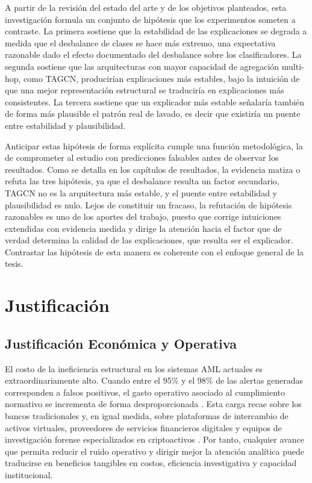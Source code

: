 A partir de la revisión del estado del arte y de los objetivos planteados, esta investigación formula un conjunto de hipótesis que los experimentos someten a contraste. La primera sostiene que la estabilidad de las explicaciones se degrada a medida que el desbalance de clases se hace más extremo, una expectativa razonable dado el efecto documentado del desbalance sobre los clasificadores. La segunda sostiene que las arquitecturas con mayor capacidad de agregación multi-hop, como TAGCN, producirían explicaciones más estables, bajo la intuición de que una mejor representación estructural se traduciría en explicaciones más consistentes. La tercera sostiene que un explicador más estable señalaría también de forma más plausible el patrón real de lavado, es decir que existiría un puente entre estabilidad y plausibilidad.

Anticipar estas hipótesis de forma explícita cumple una función metodológica, la de comprometer al estudio con predicciones falsables antes de observar los resultados. Como se detalla en los capítulos de resultados, la evidencia matiza o refuta las tres hipótesis, ya que el desbalance resulta un factor secundario, TAGCN no es la arquitectura más estable, y el puente entre estabilidad y plausibilidad es nulo. Lejos de constituir un fracaso, la refutación de hipótesis razonables es uno de los aportes del trabajo, puesto que corrige intuiciones extendidas con evidencia medida y dirige la atención hacia el factor que de verdad determina la calidad de las explicaciones, que resulta ser el explicador. Contrastar las hipótesis de esta manera es coherente con el enfoque general de la tesis.

\bigskip

\section{Justificación}

\subsection{Justificación Económica y Operativa}

El costo de la ineficiencia estructural en los sistemas AML actuales es extraordinariamente alto. Cuando entre el 95\% y el 98\% de las alertas generadas corresponden a falsos positivos, el gasto operativo asociado al cumplimiento normativo se incrementa de forma desproporcionada \cite{Unagar2025SurveyXAI}. Esta carga recae sobre los bancos tradicionales y, en igual medida, sobre plataformas de intercambio de activos virtuales, proveedores de servicios financieros digitales y equipos de investigación forense especializados en criptoactivos \cite{Subashi2024CryptocurrenciesLaundering, Spotlight2021Cryptocurrencies:Finances}. Por tanto, cualquier avance que permita reducir el ruido operativo y dirigir mejor la atención analítica puede traducirse en beneficios tangibles en costos, eficiencia investigativa y capacidad institucional.

